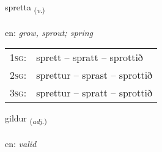 \documentclass[frontgrid, backgrid]{flacards}\usepackage[]{graphicx}\usepackage[]{xcolor}
\begin{document}
\renewcommand{\flhead}{\vskip5pt \fboxsep=0pt {\small\bfseries\footnotesize Sagnorð | Verb}}
\renewcommand{\fcfoot}{\vskip5pt \fboxsep=0pt \hspace{2pt}{\small\bfseries\footnotesize 3K}}

\renewcommand{\blhead}{\vskip5pt {\small\bfseries\footnotesize Sagnorð | Verb }}
\renewcommand{\bcfoot}{\vskip5pt \hspace{2pt}{\small\bfseries\footnotesize 3K}}


{spretta \small{\textsubscript{(\textit{v.})}} \\[1ex] %
\textphonetic{[sprɛhta]} \\
en: \emph{grow, sprout; spring} \\  [2ex]
\renewcommand*{\arraystretch}{0.8}
\begin{tabular}{p{1cm}l}
\textsc{1sg}: & sprett -- spratt -- sprottið \\ 
\textsc{2sg}: & sprettur -- sprast -- sprottið \\ 
\textsc{3sg}: & sprettur -- spratt -- sprottið \\ 
\end{tabular}
}

\renewcommand{\flhead}{\vskip5pt \fboxsep=0pt {\small\bfseries\footnotesize Lýsingarorð | Adjective}}
\renewcommand{\fcfoot}{\vskip5pt \fboxsep=0pt \hspace{2pt}{\small\bfseries\footnotesize 3K}}

\renewcommand{\blhead}{\vskip5pt {\small\bfseries\footnotesize Lýsingarorð | Adjective }}
\renewcommand{\bcfoot}{\vskip5pt \hspace{2pt}{\small\bfseries\footnotesize 3K}}


{gildur \small{\textsubscript{(\textit{adj.})}} \\[1ex] %
\textphonetic{[cɪltʏr]} \\
en: \emph{valid} \\  [2ex]
\renewcommand*{\arraystretch}{0.8}
}
\end{document}
